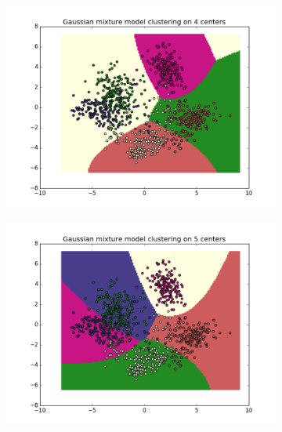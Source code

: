 \documentclass{article}
\begin{document}
\begin{center}
\begin{figure}
\centering  
        \begin{subfigure}[b]{0.48\textwidth}
                \centering
                \includegraphics[width=\linewidth]{figure_12}
        \end{subfigure}\hfill
        \begin{subfigure}[b]{0.48\textwidth}
                \centering
                \includegraphics[width=\linewidth]{figure_13}
        \end{subfigure}
        \label{fig:6}
\end{figure}


\end{center}
\end{document}
